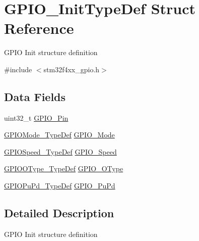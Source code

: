 \hypertarget{struct_g_p_i_o___init_type_def}{}\section{G\+P\+I\+O\+\_\+\+Init\+Type\+Def Struct Reference}
\label{struct_g_p_i_o___init_type_def}


G\+P\+IO Init structure definition ~\newline
  




{\ttfamily \#include $<$stm32f4xx\+\_\+gpio.\+h$>$}

\subsection*{Data Fields}
\begin{DoxyCompactItemize}
\item 
uint32\+\_\+t \mbox{\hyperlink{struct_g_p_i_o___init_type_def_a15699fc7e215ac2579cd24ca76cd4591}{G\+P\+I\+O\+\_\+\+Pin}}
\item 
\mbox{\hyperlink{group___g_p_i_o_ga1347339e1c84a196fabbb31205eec5d4}{G\+P\+I\+O\+Mode\+\_\+\+Type\+Def}} \mbox{\hyperlink{struct_g_p_i_o___init_type_def_a0c7e8901d8b511bbb8c3b153f705dbba}{G\+P\+I\+O\+\_\+\+Mode}}
\item 
\mbox{\hyperlink{group___g_p_i_o_ga062ad92b67b4a1f301c161022cf3ba8e}{G\+P\+I\+O\+Speed\+\_\+\+Type\+Def}} \mbox{\hyperlink{struct_g_p_i_o___init_type_def_a57b08335216f50618ebc080e4fbb0a80}{G\+P\+I\+O\+\_\+\+Speed}}
\item 
\mbox{\hyperlink{group___g_p_i_o_gae74212e8d66c389f47326b06bdf6d2ab}{G\+P\+I\+O\+O\+Type\+\_\+\+Type\+Def}} \mbox{\hyperlink{struct_g_p_i_o___init_type_def_a321a268abbed3d2f01c27383e8daf92d}{G\+P\+I\+O\+\_\+\+O\+Type}}
\item 
\mbox{\hyperlink{group___g_p_i_o_gafb7ecd99c44b4fd702d669304a36c2c8}{G\+P\+I\+O\+Pu\+Pd\+\_\+\+Type\+Def}} \mbox{\hyperlink{struct_g_p_i_o___init_type_def_aeb0168ffc465346d21f3120aec320b72}{G\+P\+I\+O\+\_\+\+Pu\+Pd}}
\end{DoxyCompactItemize}


\subsection{Detailed Description}
G\+P\+IO Init structure definition ~\newline
 

